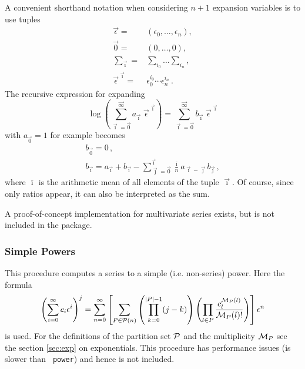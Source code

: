 \documentclass{article}
\begin{document}
A convenient shorthand notation when considering $n+1$ expansion variables is to
use tuples 
\begin{align}
\label{eq:multivar_conv}
\vec{\epsilon}=&(\epsilon_0,\dots,\epsilon_n), \\
\vec{0}=&(0,\dots,0), \\
\sum_{\vec{\imath}}=&\sum_{i_0}\dots\sum_{i_n}, \\
\vec{\epsilon}^{\;\vec{\imath}} =& \epsilon_0^{i_0 }\cdots\epsilon_n^{i_n}\,.
\end{align}
The recursive expression for expanding
\begin{equation}
  \label{eq:log_multivar}
\log\left(\sum_{\vec{\imath}=\vec{0}}^{\vec{\infty}}a_{\vec{\imath}}\;
 \vec{\epsilon}^{\;\vec{\imath}}\right)=\sum_{\vec{\imath}=\vec{0}}^{\vec{\infty}} b_{\vec{\imath}}\;\vec{\epsilon}^{\;\vec{\imath}}
 \end{equation}
with $a_{\vec{0}}=1$ for example becomes
\begin{align}
  \label{eq:rec_log_multivar}
  b_{\vec{0}}=0\,,\\
b_{\vec{\imath}}=a_{\vec{\imath}}+b_{\vec{\imath}}-\sum_{\vec{\jmath}=\vec{0}}^{\vec{\imath}}
\frac{\overline{\imath}}{\overline{n}} a_{\vec{\imath}-\vec{\jmath}} b_{\vec{\jmath}}\,,
 \end{align}
where $\overline{\imath}$ is the arithmetic mean of all elements of the tuple
$\vec{\imath}$. Of course, since only ratios appear, it can also be
interpreted as the sum.

A proof-of-concept implementation for multivariate series exists, but is
not included in the package.

\subsubsection{Simple Powers}
\label{sec:impl_simpl_pow}

This procedure computes a series to a simple
(i.e. non-series) power. Here the formula
\begin{equation}
  \label{eq:simpl_pow}
  \left(\sum_{i=0}^{\infty}c_i \epsilon^i\right)^j = \sum_{n=0}^\infty
  \left[\sum_{P \in {\cal P}(n)}\left(\prod_{k=0}^{|P|-1}
    (j-k)\right)\left(\prod_{l \in P} \frac{c^{{\cal M}_P(l)}_l}{{\cal M}_P(l)!} \right)\right]\epsilon^n
\end{equation}
is used. For the definitions of the partition set ${\cal P}$ and the
multiplicity ${\cal M}_P$ see the section \ref{sec:exp} on
exponentials. This procedure has performance issues (is slower than {\tt
  power}) and hence is not included.
\end{document}
